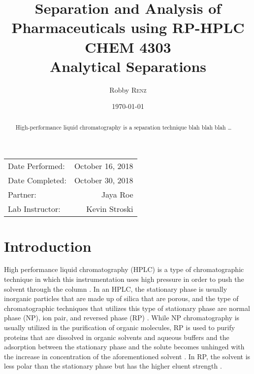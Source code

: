 \documentclass[a4paper, 12pt]{article}
\title{Separation and Analysis of Pharmaceuticals using RP-HPLC \\ CHEM 4303 \\ Analytical Separations} %
\author{Robby \textsc{Renz}} %
\date{\today} %
\begin{document}
\maketitle %

\begin{center}
\begin{tabular}{l r}
Date Performed: & October 16, 2018 \\ %
Date Completed: & October 30, 2018 \\
Partner: & Jaya Roe \\ %
Lab Instructor: & Kevin Stroski %
\end{tabular}
\end{center}


\begin{abstract}
	High-performance liquid chromatography is a separation technique blah blah blah \dots
\end{abstract}
\newpage


\section{Introduction}
High performance liquid chromatography (HPLC) is a type of chromatographic technique in which this instrumentation uses high pressure in order to push the solvent through the column \cite{harris}. In an HPLC, the stationary phase is usually inorganic particles that are made up of silica that are porous, and the type of chromatographic techniques that utilizes this type of stationary phase are normal phase (NP), ion pair, and reversed phase (RP) \cite{mold}. While NP chromatography is usually utilized in the purification of organic molecules, RP is used to purify proteins that are dissolved in organic solvents and aqueous buffers and the adsorption between the stationary phase and the solute becomes unhinged with the increase in concentration of the aforementioned solvent \cite{prep_hplc}. In RP, the solvent is less polar than the stationary phase but has the higher eluent strength \cite{harris}. 
\end{document}

